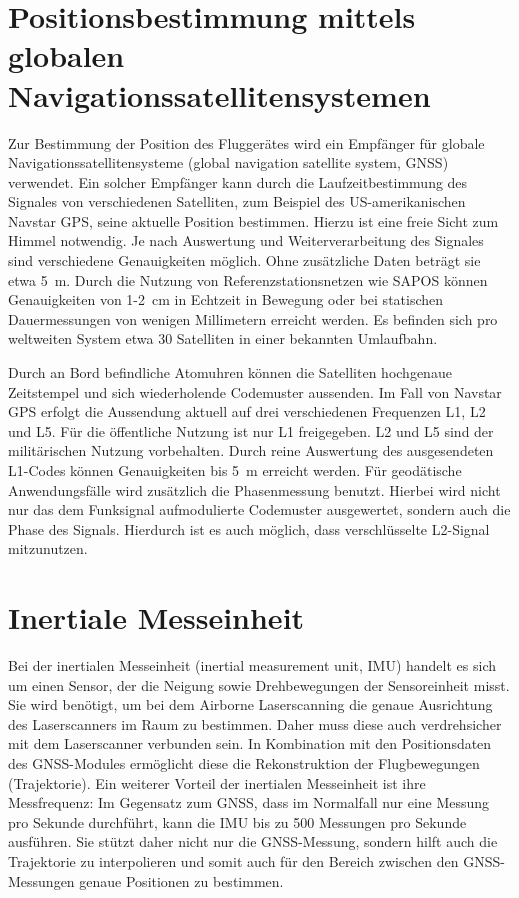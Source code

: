 \documentclass[a4paper,12pt,bibliography=totoc, listof=totoc,titlepage,pointlessnumbers]{scrreprt}
\begin{document}
\section{Positionsbestimmung mittels globalen Navigationssatellitensystemen}
\label{s:GNSS}
Zur Bestimmung der Position des Fluggerätes wird ein Empfänger für globale Navigationssatellitensysteme (global navigation satellite system, GNSS) verwendet. Ein solcher Empfänger kann durch die Laufzeitbestimmung des Signales von verschiedenen Satelliten, zum Beispiel des US-amerikanischen Navstar GPS, seine aktuelle Position bestimmen. Hierzu ist eine freie Sicht zum Himmel notwendig. Je nach Auswertung und Weiterverarbeitung des Signales sind verschiedene Genauigkeiten möglich. Ohne zusätzliche Daten beträgt sie etwa 5~m. Durch die Nutzung von Referenzstationsnetzen wie SAPOS können Genauigkeiten von 1-2~cm in Echtzeit in Bewegung oder bei statischen Dauermessungen von wenigen Millimetern erreicht werden. Es befinden sich pro weltweiten System etwa 30 Satelliten in einer bekannten Umlaufbahn. \citep[S. 375]{Witte2006}

Durch an Bord befindliche Atomuhren können die Satelliten hochgenaue Zeitstempel und sich wiederholende Codemuster aussenden. Im Fall von Navstar GPS erfolgt die Aussendung aktuell auf drei verschiedenen Frequenzen L1, L2 und L5. Für die öffentliche Nutzung ist nur L1 freigegeben. L2 und L5 sind der militärischen Nutzung vorbehalten. Durch reine Auswertung des ausgesendeten L1-Codes können Genauigkeiten bis 5~m erreicht werden. Für geodätische Anwendungsfälle wird zusätzlich die Phasenmessung benutzt. Hierbei wird nicht nur das dem Funksignal aufmodulierte Codemuster ausgewertet, sondern auch die Phase des Signals. Hierdurch ist es auch möglich, dass verschlüsselte L2-Signal mitzunutzen. \citep[S. 10f]{Witte2006}

\section{Inertiale Messeinheit}
\label{s:IMU}
Bei der inertialen Messeinheit (inertial measurement unit, IMU) handelt es sich um einen Sensor, der die Neigung sowie Drehbewegungen der Sensoreinheit misst. Sie wird benötigt, um bei dem Air\-borne Laser\-scan\-ning die genaue Ausrichtung des Laser\-scan\-ners im Raum zu bestimmen. Daher muss diese auch verdrehsicher mit dem Laser\-scan\-ner verbunden sein. In Kombination mit den Positionsdaten des GNSS-Modules ermöglicht diese die Rekonstruktion der Flugbewegungen (Trajektorie). Ein weiterer Vorteil der inertialen Messeinheit ist ihre Messfrequenz: Im Gegensatz zum GNSS, dass im Normalfall nur eine Messung pro Sekunde durchführt, kann die IMU bis zu 500 Messungen pro Sekunde ausführen. Sie stützt daher nicht nur die GNSS-Messung, sondern hilft auch die Trajektorie zu interpolieren und somit auch für den Bereich zwischen den GNSS-Messungen genaue Positionen zu bestimmen. \citep[S. 23ff]{beraldin}
\end{document}

